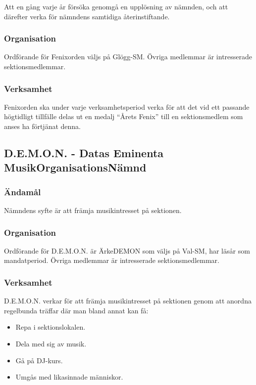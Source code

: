 \documentclass{dgovdoc}
\begin{document}
Att en gång varje år försöka genomgå en upplösning av nämnden, och att därefter
verka för nämndens samtidiga återinstiftande.

\subsubsection{Organisation}

Ordförande för Fenixorden väljs på Glögg-SM. Övriga medlemmar är intresserade sektionsmedlemmar.

\subsubsection{Verksamhet}

Fenixorden ska under varje verksamhetsperiod verka för att det vid ett passande
högtidligt tillfälle delas ut en medalj ``Årets Fenix'' till en sektionsmedlem som anses ha förtjänat denna.

\subsection{D.E.M.O.N. - Datas Eminenta MusikOrganisationsNämnd}

\subsubsection{Ändamål}

Nämndens syfte är att främja musikintresset på sektionen.

\subsubsection{Organisation}

Ordförande för D.E.M.O.N. är ÄrkeDEMON som väljs på Val-SM, har läsår som
mandatperiod. Övriga medlemmar är intresserade sektionsmedlemmar.

\subsubsection{Verksamhet}

D.E.M.O.N. verkar för att främja musikintresset på sektionen genom att anordna
regelbunda träffar där man bland annat kan få:

\begin{itemize}
\item Repa i sektionslokalen.
\item Dela med sig av musik.
\item Gå på DJ-kurs.
\item Umgås med likasinnade människor.
\end{itemize}
\end{document}
